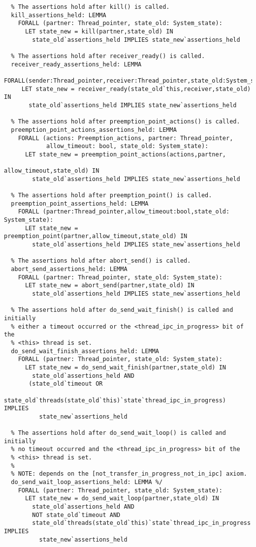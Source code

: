 \begin{lstlisting}
  % The assertions hold after kill() is called.
  kill_assertions_held: LEMMA
    FORALL (partner: Thread_pointer, state_old: System_state):
      LET state_new = kill(partner,state_old) IN
        state_old`assertions_held IMPLIES state_new`assertions_held

  % The assertions hold after receiver_ready() is called.
  receiver_ready_assertions_held: LEMMA
   FORALL(sender:Thread_pointer,receiver:Thread_pointer,state_old:System_state):
     LET state_new = receiver_ready(state_old`this,receiver,state_old) IN
       state_old`assertions_held IMPLIES state_new`assertions_held

  % The assertions hold after preemption_point_actions() is called.
  preemption_point_actions_assertions_held: LEMMA
    FORALL (actions: Preemption_actions, partner: Thread_pointer,
            allow_timeout: bool, state_old: System_state):
      LET state_new = preemption_point_actions(actions,partner,
                                               allow_timeout,state_old) IN
        state_old`assertions_held IMPLIES state_new`assertions_held 

  % The assertions hold after preemption_point() is called.
  preemption_point_assertions_held: LEMMA
    FORALL (partner:Thread_pointer,allow_timeout:bool,state_old: System_state):
      LET state_new = preemption_point(partner,allow_timeout,state_old) IN
        state_old`assertions_held IMPLIES state_new`assertions_held 

  % The assertions hold after abort_send() is called.
  abort_send_assertions_held: LEMMA
    FORALL (partner: Thread_pointer, state_old: System_state):
      LET state_new = abort_send(partner,state_old) IN
        state_old`assertions_held IMPLIES state_new`assertions_held 

  % The assertions hold after do_send_wait_finish() is called and initially
  % either a timeout occurred or the <thread_ipc_in_progress> bit of the
  % <this> thread is set.
  do_send_wait_finish_assertions_held: LEMMA
    FORALL (partner: Thread_pointer, state_old: System_state):
      LET state_new = do_send_wait_finish(partner,state_old) IN
        state_old`assertions_held AND         
       (state_old`timeout OR 
        state_old`threads(state_old`this)`state`thread_ipc_in_progress) IMPLIES
          state_new`assertions_held 

  % The assertions hold after do_send_wait_loop() is called and initially
  % no timeout occurred and the <thread_ipc_in_progress> bit of the 
  % <this> thread is set.
  %
  % NOTE: depends on the [not_transfer_in_progress_not_in_ipc] axiom.
  do_send_wait_loop_assertions_held: LEMMA %/
    FORALL (partner: Thread_pointer, state_old: System_state):
      LET state_new = do_send_wait_loop(partner,state_old) IN
        state_old`assertions_held AND 
        NOT state_old`timeout AND        
        state_old`threads(state_old`this)`state`thread_ipc_in_progress IMPLIES
          state_new`assertions_held 


\end{lstlisting}
